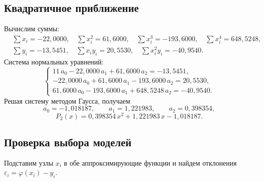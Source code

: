 \documentclass[12pt,a4paper]{article}
\begin{document}
\subsection*{Квадратичное приближение}
Вычислим суммы:
\[
\begin{aligned}
    &\sum x_i=-22{,}0000,\quad \sum x_i^2=61{,}6000,\quad \sum x_i^3=-193{,}6000,\quad \sum x_i^4=648{,}5248,\\
    &\sum y_i=-13{,}5451,\quad \sum x_iy_i=20{,}5530,\quad \sum x_i^2y_i=-40{,}9540 .
\end{aligned}
\]
Система нормальных уравнений:
\[
    \begin{cases}
        11\,a_0-22{,}0000\,a_1+61{,}6000\,a_2=-13{,}5451,\\
        -22{,}0000\,a_0+61{,}6000\,a_1-193{,}6000\,a_2=20{,}5530,\\
        61{,}6000\,a_0-193{,}6000\,a_1+648{,}5248\,a_2=-40{,}9540 .
    \end{cases}
\]
Решая систему методом Гаусса, получаем
\[
    a_0=-1{,}018187,\qquad a_1=1{,}221983,\qquad a_2=0{,}398354,
\]
\[
    P_2(x)=0{,}398354\,x^2+1{,}221983\,x-1{,}018187 .
\]

\subsection*{Проверка выбора моделей}
Подставим узлы $x_i$ в обе аппроксимирующие функции и найдем отклонения $\varepsilon_i=\varphi(x_i)-y_i$.
\end{document}
